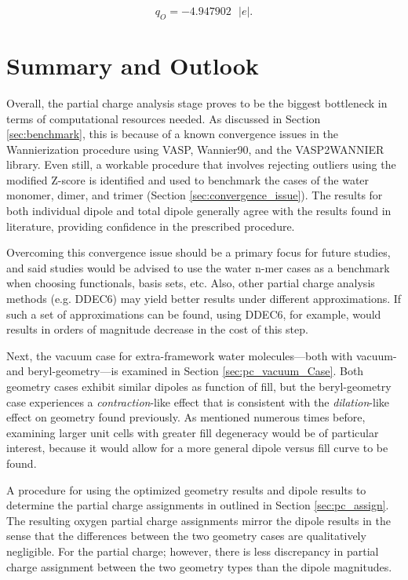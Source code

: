        \begin{equation}
            q_O = -4.947902\text{ } |e|.
        \end{equation}
        
    \section{Summary and Outlook}
    
    Overall, the partial charge analysis stage proves to be the biggest bottleneck in terms of computational resources needed. As discussed in Section \ref{sec:benchmark}, this is because of a known convergence issues in the Wannierization procedure using VASP, Wannier90, and the VASP2WANNIER library. Even still, a workable procedure that involves rejecting outliers using the modified Z-score is identified and used to benchmark the cases of the water monomer, dimer, and trimer (Section \ref{sec:convergence_issue}). The results for both individual dipole and total dipole generally agree with the results found in literature, providing confidence in the prescribed procedure.
    
    Overcoming this convergence issue should be a primary focus for future studies, and said studies would be advised to use the water n-mer cases as a benchmark when choosing functionals, basis sets, etc. Also, other partial charge analysis methods (e.g. DDEC6) may yield better results under different approximations. If such a set of approximations can be found, using DDEC6, for example, would results in orders of magnitude decrease in the cost of this step.
    
    Next, the vacuum case for extra-framework water molecules---both with vacuum- and beryl-geometry---is examined in Section \ref{sec:pc_vacuum_Case}. Both geometry cases exhibit similar dipoles as function of fill, but the beryl-geometry case experiences a \textit{contraction}-like effect that is consistent with the \textit{dilation}-like effect on geometry found previously. As mentioned numerous times before, examining larger unit cells with greater fill degeneracy would be of particular interest, because it would allow for a more general dipole versus fill curve to be found.
    
    A procedure for using the optimized geometry results and dipole results to determine the partial charge assignments in outlined in Section \ref{sec:pc_assign}. The resulting oxygen partial charge assignments mirror the dipole results in the sense that the differences between the two geometry cases are qualitatively negligible. For the partial charge; however, there is less discrepancy in partial charge assignment between the two geometry types than the dipole magnitudes.
    
